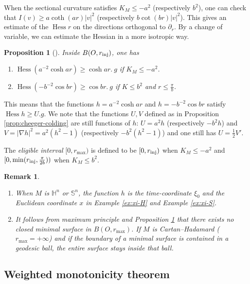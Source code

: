 \documentclass[11pt]{article}
\newtheorem{remark}[theorem]{Remark}
\newtheorem{proposition}[theorem]{Proposition}
\DeclareMathOperator{\hess}{Hess}
\begin{document}
When the sectional curvature
satisfies \(K_M\leq -a^2\) (respectively \(b^2\)), one can check that
\(I(v) \geq a\coth(ar)|v|^2\) (respectively \(b\cot (br)|v|^2\)). This gives an estimate of the \(\hess r\) on the
directions orthogonal to \(\partial_r\). By a change of variable, we can estimate the Hessian in a more isotropic way. 

\begin{proposition}[]
\label{prop:hess-r}
Inside \(B(O,r_{\rm inj})\), one has
\begin{enumerate}
\item \(\hess (a^{-2}\cosh ar) \geq \cosh ar.\ g\) if \(K_M\leq -a^2\).
\item \(\hess (-b^{-2}\cos br) \geq \cos br.\ g\) if \(K\leq b^2\) and \(r\leq \frac{\pi}{b}\).
\end{enumerate}
\end{proposition}
This means that the functions \(h=a^{-2}\cosh ar\) and \(h=-b^{-2}\cos br\) satisfy \(\hess h \geq
U.g\). 
We note that the functions \(U, V\) defined as in Proposition \ref{prop:cheeger-colding}
are still functions of \(h\): \(U= a^2 h\) (respectively \(-b^2 h\)) and \(V = |\nabla h|^2 = a^2
(h^2-1)\) (respectively \(-b^2 (h^2-1)\)) and one still has \(U = \frac{1}{2}V'\).

The \emph{eligible interval} \([0,r_{ \max})\) is defined to be \([0, r_{\rm inj})\) when
\(K_M\leq -a^2\) and \([0, \min (r_{\rm inj}, \frac{\pi}{2b}))\) when \(K_M\leq b^2\).

\begin{remark}
\label{rem:no-min-K}
\begin{enumerate}
\item When \(M\) is \(\mathbb{H}^n\) or \(\mathbb{S}^n\), the function \(h\) is the time-coordinate \(\xi_0\) and
the Euclidean coordinate \(x\) in Example \ref{ex:xi-H} and Example \ref{ex:xi-S}.
\item It follows from maximum principle and Proposition \ref{prop:hess-r} that there exists no closed
minimal surface in \(B(O, r_{\max})\). If \(M\) is Cartan--Hadamard (\(r_{\max}=+\infty\)) and if the boundary of a
minimal surface is contained in a geodesic ball, the entire surface stays inside that ball.
\end{enumerate}
\end{remark}

\subsection{Weighted monotonicity theorem}
\label{sec:orgb7c5ec5}
\end{document}
